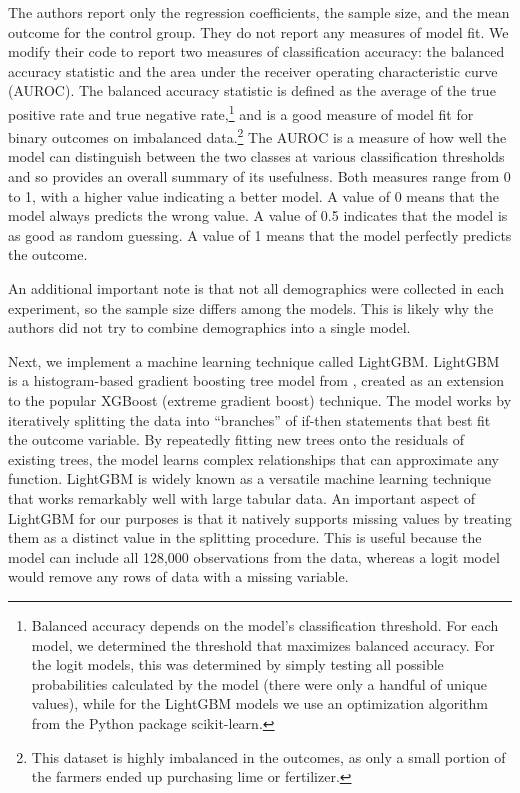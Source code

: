 \documentclass[12pt]{article}
\begin{document}
The authors report only the regression coefficients, the sample size, and the mean outcome for the control group. They do not report any measures of model fit. We modify their code to report two measures of classification accuracy: the balanced accuracy statistic and the area under the receiver operating characteristic curve (AUROC). The balanced accuracy statistic is defined as the average of the true positive rate and true negative rate,\footnote{Balanced accuracy depends on the model's classification threshold. For each model, we determined the threshold that maximizes balanced accuracy. For the logit models, this was determined by simply testing all possible probabilities calculated by the model (there were only a handful of unique values), while for the LightGBM models we use an optimization algorithm from the Python package \textsf{scikit-learn}.} and is a good measure of model fit for binary outcomes on imbalanced data.\footnote{This dataset is highly imbalanced in the outcomes, as only a small portion of the farmers ended up purchasing lime or fertilizer.} The AUROC is a measure of how well the model can distinguish between the two classes at various classification thresholds and so provides an overall summary of its usefulness. Both measures range from 0 to 1, with a higher value indicating a better model. A value of 0 means that the model always predicts the wrong value. A value of 0.5 indicates that the model is as good as random guessing. A value of 1 means that the model perfectly predicts the outcome.

An additional important note is that not all demographics were collected in each experiment, so the sample size differs among the models. This is likely why the authors did not try to combine demographics into a single model.

Next, we implement a machine learning technique called LightGBM. LightGBM is a histogram-based gradient boosting tree model from \textcite{ke_lightgbm_2017}, created as an extension to the popular XGBoost (extreme gradient boost) technique. The model works by iteratively splitting the data into ``branches'' of if-then statements that best fit the outcome variable. By repeatedly fitting new trees onto the residuals of existing trees, the model learns complex relationships that can approximate any function. LightGBM is widely known as a versatile machine learning technique that works remarkably well with large tabular data. An important aspect of LightGBM for our purposes is that it natively supports missing values by treating them as a distinct value in the splitting procedure. This is useful because the model can include all 128,000 observations from the data, whereas a logit model would remove any rows of data with a missing variable.
\end{document}
